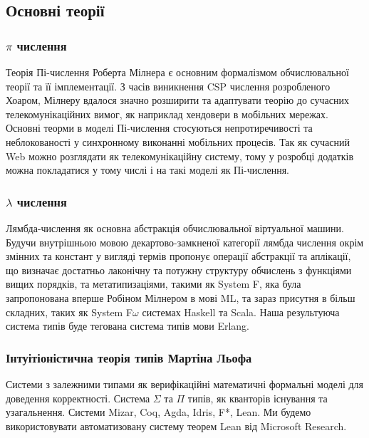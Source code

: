 \documentclass[11pt,oneside]{article}
\begin{document}
\newpage
\subsection{Основні теорії}
\vspace{0.3cm}
   \subsubsection{$\pi$ числення}
   Теорія Пі-числення Роберта Мілнера є основним формалізмом обчислювальної
   теорії та її імплементації. З часів виникнення CSP числення розробленого Хоаром,
   Мілнеру вдалося значно розширити та адаптувати теорію до сучасних
   телекомунікаційних вимог, як наприклад хендовери в мобільних мережах.
   Основні теорми в моделі Пі-числення стосуються непротиречивості та неблокованості
   у синхронному виконанні мобільних процесів. Так як сучасний Web можно розглядати
   як телекомунікаційну систему, тому у розробці додатків можна покладатися у тому
   числі і на такі моделі як Пі-числення.

   \subsubsection{$\lambda$ числення}
   Лямбда-числення як основна абстракція обчислювальної віртуальної машини.
   Будучи внутрішньою мовою декартово-замкненої категорії лямбда числення окрім змінних
   та констант у вигляді термів пропонує операції абстракції та аплікації, що визначає
   достатньо лаконічну та потужну структуру обчислень з функціями вищих порядків,
   та метатипизаціями, такими як System F, яка була запропонована
   вперше Робіном Мілнером в мові ML, та зараз присутня в більш складних,
   таких як System F$\omega$ системах Haskell та Scala. Наша результуюча система
   типів буде тегована система типів мови Erlang.

   \subsubsection{Інтуітіоністична теорія типів Мартіна Льофа}
   Системи з залежними типами як верифікаційні математичні формальні моделі
   для доведення корректності. Система $\Sigma$ та $\Pi$ типів, як кванторів
   існування та узагальнення. Системи Mizar, Coq, Agda, Idris, F*, Lean. Ми будемо
   використовувати автоматизовану систему теорем Lean від Microsoft Research.
\end{document}
